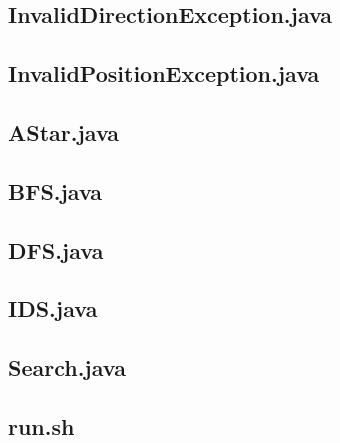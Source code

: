 \documentclass[a4paper]{article}
\begin{document}
\begin{appendices}
    \subsection{InvalidDirectionException.java}
  \label{app:code-InvalidDirectionException}
  

  \subsection{InvalidPositionException.java}
  \label{app:code-InvalidPositionException}
  

  \newpage
  \subsection{AStar.java}
  \label{app:code-AStar}
  

  \newpage
  \subsection{BFS.java}
  \label{app:code-BFS}
  

  \newpage
  \subsection{DFS.java}
  \label{app:code-DFS}
  

  \newpage
  \subsection{IDS.java}
  \label{app:code-IDS}
  

  \newpage
  \subsection{Search.java}
  \label{app:code-Search}
  

  \newpage
  \subsection{run.sh}
  \label{app:code-run}
  


\end{appendices}
\end{document}
